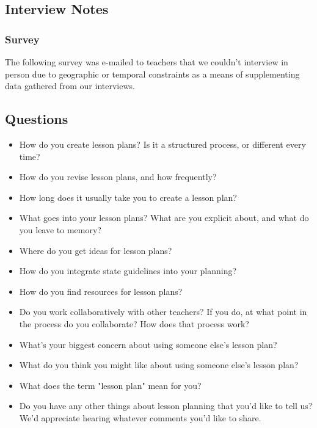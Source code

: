 \documentclass[10pt,letter,titlepage]{article}
\begin{document}
\subsection{Interview Notes}
\begingroup
\let\section\subsubsection
\label{interview notes}

\endgroup

\section{Survey}
\label{survey}
The following survey was e-mailed to teachers that we couldn't interview in
person due to geographic or temporal constraints as a means of supplementing
data gathered from our interviews.

\subsection{Questions}
\begin{itemize}
\item How do you create lesson plans?  Is it a structured process, or different
      every time?
\item How do you revise lesson plans, and how frequently?
\item How long does it usually take you to create a lesson plan?
\item What goes into your lesson plans?  What are you explicit about, and what
      do you leave to memory?
\item Where do you get ideas for lesson plans?
\item How do you integrate state guidelines into your planning?
\item How do you find resources for lesson plans?
\item Do you work collaboratively with other teachers?  If you do, at what point
      in the process do you collaborate?  How does that process work?
\item What's your biggest concern about using someone else's lesson plan?
\item What do you think you might like about using someone else's lesson plan?
\item What does the term "lesson plan" mean for you?
\item Do you have any other things about lesson planning that you'd like to tell
      us?  We'd appreciate hearing whatever comments you'd like to share.
\end{itemize}
\end{document}
